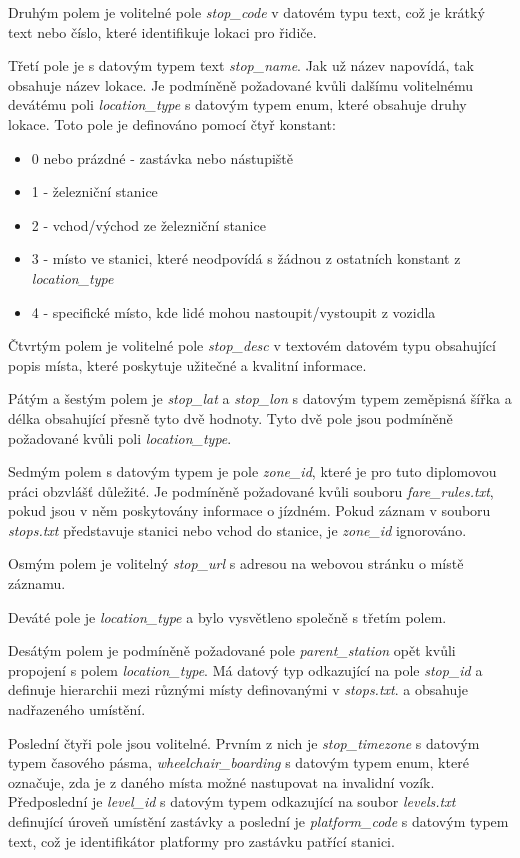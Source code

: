 Druhým polem je volitelné pole \textit{stop\_code} v datovém typu text, což je krátký text nebo číslo, 
které identifikuje lokaci pro řidiče. 

Třetí pole je s datovým typem text \textit{stop\_name}. Jak už název napovídá, tak obsahuje název lokace. 
Je podmíněně požadované kvůli dalšímu volitelnému devátému poli \textit{location\_type} s datovým typem enum, 
které obsahuje druhy lokace.
Toto pole je definováno pomocí čtyř konstant:
\begin{itemize} 
\item 0 nebo prázdné - zastávka nebo nástupiště
\item 1 - železniční stanice 
\item 2 - vchod/východ ze železniční stanice 
\item 3 - místo ve stanici, které neodpovídá s žádnou z ostatních konstant z \textit{location\_type} 
\item 4 - specifické místo, kde lidé mohou nastoupit/vystoupit z vozidla
\end{itemize}

Čtvrtým polem je volitelné pole \textit{stop\_desc} v textovém datovém typu obsahující popis místa, 
které poskytuje užitečné a kvalitní informace.

Pátým a šestým polem je \textit{stop\_lat} a \textit{stop\_lon} s datovým typem zeměpisná šířka a délka
obsahující přesně tyto dvě hodnoty. Tyto dvě pole jsou podmíněně požadované kvůli poli \textit{location\_type}.

Sedmým polem s datovým typem  je pole \textit{zone\_id}, které je pro tuto diplomovou práci obzvlášť důležité.
Je podmíněně požadované kvůli  souboru \textit{fare\_rules.txt}, pokud jsou v něm poskytovány informace o jízdném.
Pokud záznam v  souboru \textit{stops.txt} představuje stanici nebo vchod do stanice, je \textit{zone\_id} ignorováno.

Osmým polem je volitelný \textit{stop\_url} s  adresou na webovou stránku o místě záznamu.

Deváté pole je \textit{location\_type} a bylo vysvětleno společně s třetím polem.

Desátým polem je podmíněně požadované pole \textit{parent\_station} opět kvůli propojení s polem \textit{location\_type}.
Má datový typ  odkazující na pole \textit{stop\_id} a definuje hierarchii mezi různými místy definovanými v \textit{stops.txt}. 
a obsahuje  nadřazeného umístění.

Poslední čtyři pole jsou volitelné. Prvním z nich je \textit{stop\_timezone} s datovým typem časového pásma,
\textit{wheelchair\_boarding} s datovým typem enum, které označuje, zda je z daného místa možné nastupovat na invalidní vozík.
Předposlední je \textit{level\_id} s datovým typem  odkazující na soubor \textit{levels.txt} defi\-nující úroveň
umístění zastávky a poslední je \textit{platform\_code} s datovým typem text, 
což je identifikátor platformy pro zastávku patřící stanici.

